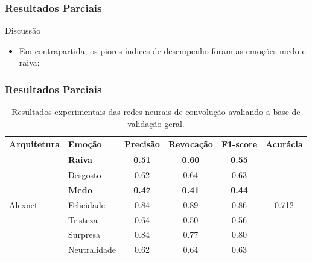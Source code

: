 \documentclass{beamer}
\begin{document}
\begin{frame}
\frametitle{Resultados Parciais}
 \begin{block}{Discussão}
\begin{itemize}
\pause
\item Em contrapartida, os piores índices de desempenho foram as emoções medo e raiva;

\end{itemize}
\end{block}
\end{frame}



\begin{frame}
 \frametitle{Resultados Parciais}
\begin{table}[]
\tiny
\centering
\caption{Resultados experimentais das redes neurais de convolução avaliando a base de validação geral.}
\label{table:resultsexp}
\begin{tabular}{llcccc}
\hline
\textbf{Arquitetura}                & \textbf{Emoção}       & \textbf{Precisão} & \textbf{Revocação} & \textbf{F1-score} & \textbf{Acurácia}               \\ \hline
\multirow{8}{*}{Alexnet}            & \scriptsize \textbf{Raiva}                 & \scriptsize \textbf{0.51}              & \scriptsize \textbf{0.60}               & \scriptsize \textbf{0.55}              & \multirow{8}{*}{0.712}          \\
                                    & Desgosto              & 0.62              & 0.64               & 0.63              &                                 \\
                                    & \scriptsize \textbf{Medo}                  & \scriptsize \textbf{0.47}              & \scriptsize \textbf{0.41}               & \scriptsize \textbf{0.44}              &                                 \\
                                    & Felicidade            & 0.84              & 0.89               & 0.86              &                                 \\
                                    & Tristeza              & 0.64              & 0.50               & 0.56              &                                 \\
                                    & Surpresa              & 0.84              & 0.77               & 0.80              &                                 \\
                                    & Neutralidade          & 0.62              & 0.64               & 0.63              &                                 \\

\end{tabular}
\end{table}
\end{frame}
\end{document}

